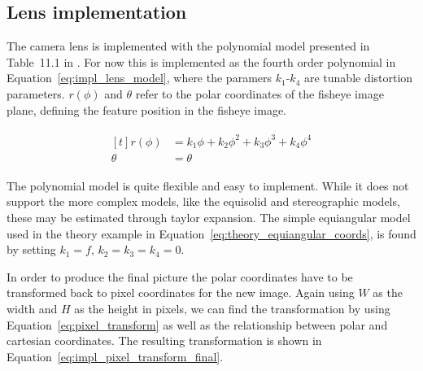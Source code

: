 \subsection{Lens implementation}

The camera lens is implemented with the polynomial model presented in Table~11.1 in \cite{FisheyeCorke}. For now this is implemented as the fourth order polynomial in Equation~\eqref{eq:impl_lens_model}, where the paramers $k_1$-$k_4$ are tunable distortion parameters. $r(\phi)$ and $\theta$ refer to the polar coordinates of the fisheye image plane, defining the feature position in the fisheye image.

\begin{align}
    \begin{aligned}[t]
    r(\phi) &= k_1 \phi + k_2 \phi^2 + k_3 \phi^3 + k_4 \phi^4 \\[0.75ex]
    \theta &= \theta
    \end{aligned}
    \label{eq:impl_lens_model}
\end{align}

The polynomial model is quite flexible and easy to implement. While it does not support the more complex models, like the equisolid and stereographic models, these may be estimated through taylor expansion. The simple equiangular model used in the theory example in Equation~\eqref{eq:theory_equiangular_coords}, is found by setting $k_1 = f$, $k_2 = k_3 = k_4 = 0$.

In order to produce the final picture the polar coordinates have to be transformed back to pixel coordinates for the new image. Again using $W$ as the width and $H$ as the height in pixels, we can find the transformation by using Equation~\eqref{eq:pixel_transform} as well as the relationship between polar and cartesian coordinates. The resulting transformation is shown in Equation~\eqref{eq:impl_pixel_transform_final}.

